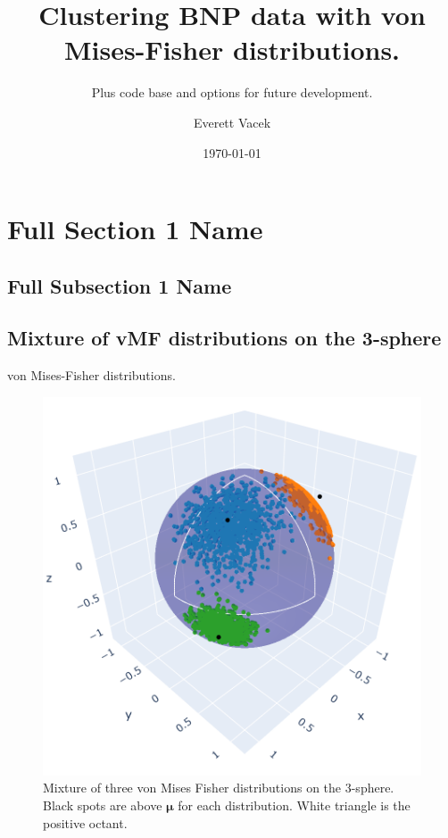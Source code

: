 \documentclass[
]{beamer}
\title[Short Presentation Title]{Clustering BNP data with von Mises-Fisher distributions.}
\subtitle[Short Presentation Subtitle]{Plus code base and options for future development.}
\author[E. Vacek]{Everett Vacek}
\date{\today}
\begin{document}
\begin{frame}[plain]
\maketitle
\end{frame}

\section[Short Section 1 Name]{Full Section 1 Name}
\subsection[Short Subsection 1 Name]{Full Subsection 1 Name}

\subsection[movMF image]{Mixture of vMF distributions on the 3-sphere}
\begin{frame}{von Mises-Fisher distributions.}
\begin{figure}[h]
  \includegraphics[width=.5\textwidth,height=.5\textheight,keepaspectratio]{vMF.png}
  \caption{Mixture of three von Mises Fisher distributions on the 3-sphere. Black spots are above $\boldsymbol{\mu}$ for each distribution. White triangle is the positive octant.
  }
\end{figure}
\end{frame}
\end{document}
